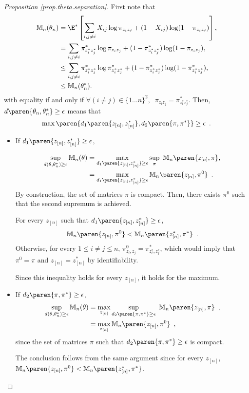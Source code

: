 \documentclass[11pt]{article}
\newtheorem{proof}{Proof}%
\newcommand{\zn}{z_{[n]}}
\begin{document}
\begin{proof}[Proposition \ref{prop.theta.separation}]
First note that
\begin{align*}
\mathbb{M}_n(\theta_n) & =\E^* \left[ \sum_{i,j \neq i} X_{ij}\log\pi_{z_iz_j}+(1-X_{ij})\log(1-\pi_{z_iz_j}) \right], \\
 & = \sum_{i,j \neq i} \pi^*_{z^*_iz^*_j}\log\pi_{z_iz_j}+(1-\pi^*_{z^*_iz^*_j})\log(1-\pi_{z_iz_j}),\\
 & \le \sum_{i,j \neq i} \pi^*_{z^*_iz^*_j}\log\pi^*_{z^*_iz^*_j}+(1-\pi^*_{z^*_iz^*_j})\log(1-\pi^*_{z^*_iz^*_j}),\\
 & \le \mathbb{M}_n(\theta^*_n).
 \end{align*}
with equality if and only if $\forall (i \neq j) \in \{ 1...n \} ^2, \; \; \pi_{z_iz_j}=\pi^*_{z^*_iz^*_j}$. Then, $d\paren{\theta_n,\theta_n^*}\geq \epsilon$ means that
\begin{align*}
        \max\paren{d_1\paren{\zn,\zn^*},
        d_2\paren{\pi,\pi^*}}\geq \epsilon\enspace.
\end{align*}
\begin{itemize}
        \item If $d_1\paren{\zn,\zn^*}\geq \epsilon$,

\begin{align*}
        \sup_{d(\theta,\theta_n^*)\geq\epsilon } \mathbb{M}_n(\theta) & = \max_{d_1\paren{\zn,\zn^*}\geq \epsilon} \sup_{\pi}\  \mathbb{M}_n\paren{\zn,\pi},\\
        & = \max_{d_1\paren{\zn,\zn^*}\geq \epsilon} \mathbb{M}_n\paren{\zn,\pi^0}\enspace.
\end{align*}
By construction, the set of matrices $\pi$ is compact. Then, there exists $\pi^0$ such that the second supremum is achieved.

For every $\zn$ such that $d_1\paren{\zn,\zn^*}\geq \epsilon$,
\begin{align*}
        \mathbb{M}_n\paren{\zn,\pi^0} < \mathbb{M}_n\paren{\zn^*,\pi^*}\enspace.
\end{align*}
Otherwise, for every $1\leq i \neq j \leq n$, $\pi^0_{z_i,z_j}=\pi^*_{z^*_i,z^*_j}$, which would imply that $\pi^0=\pi$ and $\zn =\zn^*$ by identifiability.

Since this inequality holds for every $\zn$, it holds for the maximum.


        \item If $d_2\paren{\pi,\pi^*}\geq \epsilon$,
\begin{align*}
\sup_{d(\theta,\theta_n^*)\geq\epsilon } \mathbb{M}_n(\theta) & = \max_{\zn} \sup_{d_2\paren{\pi,\pi^*}\geq \epsilon}\  \mathbb{M}_n\paren{\zn,\pi}\enspace,\\
& = \max_{\zn}   \mathbb{M}_n\paren{\zn,\pi^0}\enspace,
\end{align*}
since the set of matrices $\pi$ such that $d_2\paren{\pi,\pi^*}\geq \epsilon$ is compact.

The conclusion follows from the same argument since for every $\zn$,
$\mathbb{M}_n\paren{\zn,\pi^0}< \mathbb{M}_n\paren{\zn^*,\pi^*}$.
\end{itemize}

\end{proof}
\end{document}
